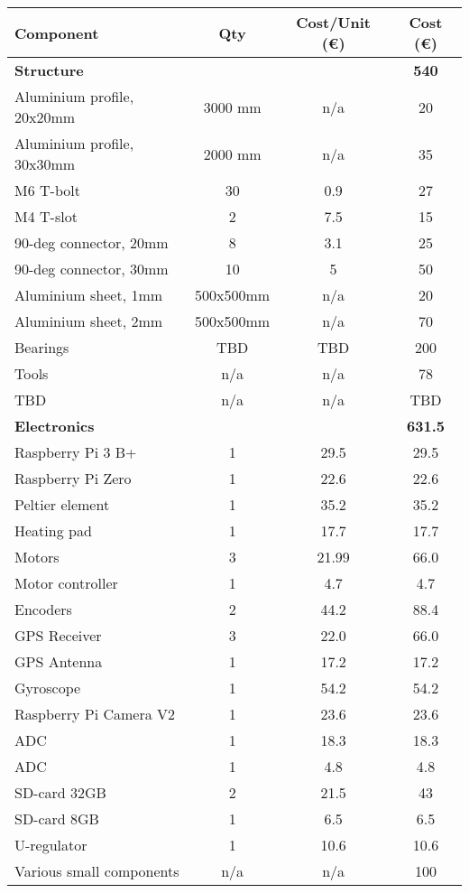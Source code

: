 \begin{table}[H]
\centering
\begin{tabular}{|l|c|c|c|} 
\hline
Component & Qty & Cost/Unit (\euro) & Cost (\euro)  \\ 
\hline
\rowcolor[HTML]{9B9B9B}
\textbf{Structure} &  &  & \textbf{540}  \\
Aluminium profile, 20x20mm & 3000 mm & n/a & 20  \\
Aluminium profile, 30x30mm & 2000 mm & n/a & 35  \\
M6 T-bolt & 30 & 0.9 & 27  \\
M4 T-slot & 2 & 7.5 & 15  \\
90-deg connector, 20mm & 8 & 3.1 & 25 \\
90-deg connector, 30mm & 10 & 5 & 50 \\
Aluminium sheet, 1mm & 500x500mm & n/a & 20 \\
Aluminium sheet, 2mm & 500x500mm & n/a & 70 \\
Bearings & TBD & TBD & 200 \\
Tools & n/a & n/a & 78 \\
TBD & n/a & n/a & TBD  \\

\rowcolor[HTML]{9B9B9B}
\textbf{Electronics} &  &  & \textbf{631.5}  \\ 
Raspberry Pi 3 B+ & 1 & 29.5 & 29.5  \\
Raspberry Pi Zero & 1 & 22.6 & 22.6  \\
Peltier element & 1 & 35.2 & 35.2  \\
Heating pad & 1 & 17.7 & 17.7  \\ 
Motors & 3 & 21.99 & 66.0  \\ 
Motor controller & 1 & 4.7 & 4.7  \\
Encoders & 2 & 44.2 & 88.4  \\
GPS Receiver & 3 & 22.0 & 66.0  \\ 
GPS Antenna & 1 & 17.2 & 17.2  \\
Gyroscope & 1 & 54.2 & 54.2  \\
Raspberry Pi Camera V2 & 1 & 23.6 & 23.6  \\ 
ADC & 1 & 18.3 & 18.3  \\ 
ADC & 1 & 4.8 & 4.8  \\
SD-card 32GB & 2 & 21.5 & 43  \\
SD-card 8GB & 1 & 6.5 & 6.5  \\
U-regulator & 1 & 10.6 & 10.6  \\
Various small components & n/a & n/a & 100  \\


\end{tabular}
\end{table}
